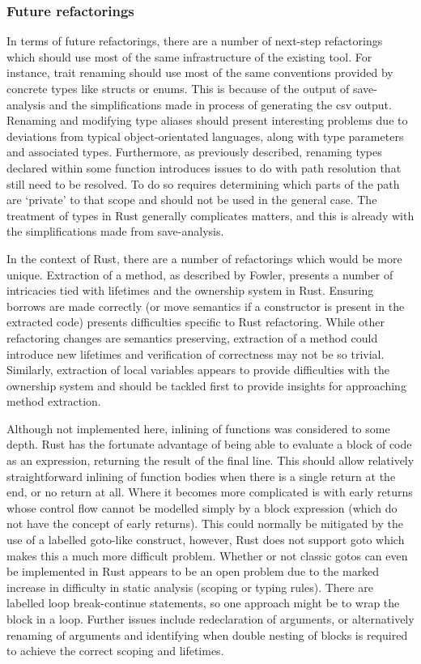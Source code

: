 \subsubsection{Future refactorings}
In terms of future refactorings, there are a number of next-step refactorings which should use most of the same infrastructure of the existing tool. For instance, trait renaming should use most of the same conventions provided by concrete types like structs or enums. This is because of the output of save-analysis and the simplifications made in process of generating the csv output. Renaming and modifying type aliases should present interesting problems due to deviations from typical object-orientated languages, along with type parameters and associated types. Furthermore, as previously described, renaming types declared within some function introduces issues to do with path resolution that still need to be resolved. To do so requires determining which parts of the path are `private' to that scope and should not be used in the general case. The treatment of types in Rust generally complicates matters, and this is already with the simplifications made from save-analysis.

In the context of Rust, there are a number of refactorings which would be more unique. Extraction of a method, as described by Fowler, presents a number of intricacies tied with lifetimes and the ownership system in Rust. Ensuring borrows are made correctly (or move semantics if a constructor is present in the extracted code) presents difficulties specific to Rust refactoring. While other refactoring changes are semantics preserving, extraction of a method could introduce new lifetimes and verification of correctness may not be so trivial. Similarly, extraction of local variables appears to provide difficulties with the ownership system and should be tackled first to provide insights for approaching method extraction.

Although not implemented here, inlining of functions was considered to some depth. Rust has the fortunate advantage of being able to evaluate a block of code as an expression, returning the result of the final line. This should allow relatively straightforward inlining of function bodies when there is a single return at the end, or no return at all. Where it becomes more complicated is with early returns whose control flow cannot be modelled simply by a block expression (which do not have the concept of early returns). This could normally be mitigated by the use of a labelled goto-like construct, however, Rust does not support goto which makes this a much more difficult problem. Whether or not classic gotos can even be implemented in Rust appears to be an open problem due to the marked increase in difficulty in static analysis (scoping or typing rules). There are labelled loop break-continue statements, so one approach might be to wrap the block in a loop. Further issues include redeclaration of arguments, or alternatively renaming of arguments and identifying when double nesting of blocks is required to achieve the correct scoping and lifetimes. 

